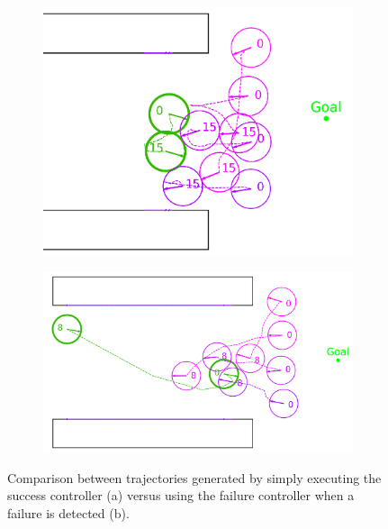 \documentclass[letterpaper, 10 pt, conference]{ieeeconf}  %
\begin{document}
	\begin{figure}
		\centering
		\begin{subfigure}[t]{0.48\linewidth}
			\centering
			\includegraphics[width=\linewidth]{failure_without_failure_controller}
			\caption{}
			\label{fig:failure_without_failure_controller}
		\end{subfigure}\hfill
		\begin{subfigure}[t]{0.48\linewidth}
			\centering
			\includegraphics[width=\linewidth]{failure_with_failure_controller}
			\caption{}
		\end{subfigure}
		\caption{Comparison between trajectories generated by simply executing the success controller (a) versus using the failure controller when a failure is detected (b).}
		\label{fig:experimentscomparison}
	\end{figure}
\end{document}

